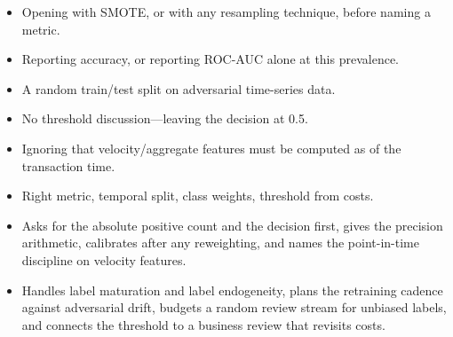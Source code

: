 \begin{interviewq}
\redflags
\begin{itemize}
    \item Opening with SMOTE, or with any resampling technique, before naming a metric.
    \item Reporting accuracy, or reporting ROC-AUC alone at this prevalence.
    \item A random train/test split on adversarial time-series data.
    \item No threshold discussion---leaving the decision at 0.5.
    \item Ignoring that velocity/aggregate features must be computed as of the transaction time.
\end{itemize}


\goodgreat
\begin{itemize}
    \item {} Right metric, temporal split, class weights, threshold from costs.
    \item {} Asks for the absolute positive count and the decision first, gives the precision arithmetic, calibrates after any reweighting, and names the point-in-time discipline on velocity features.
    \item {} Handles label maturation and label endogeneity, plans the retraining cadence against adversarial drift, budgets a random review stream for unbiased labels, and connects the threshold to a business review that revisits costs.
\end{itemize}

\end{interviewq}

